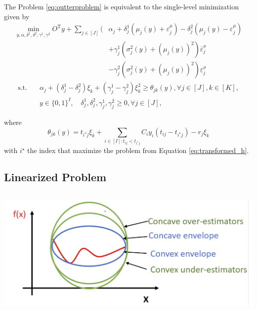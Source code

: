 \documentclass{beamer}
\newcommand{\T}{\mathrm{T}}
\begin{document}
\begin{frame}[allowframebreaks]
	\framebreak
	\begin{theorem}
		The Problem \ref{eq:outterproblem} is equivalent to the single-level minimization given by
		\begin{align*}
			\min_{y, \alpha, \delta^1, \delta^2, \gamma^1, \gamma^2} O^\T y + \sum_{j \in [J]} \Bigg( &\alpha_j + \delta_j^1 \left(\mu_j(y) + \varepsilon_j^\mu\right) - \delta_j^2 \left(\mu_j(y) - \varepsilon_j^\mu\right) \\
			& + \gamma_j^1 \left(\sigma_j^2(y) + (\mu_j(y))^2\right)\overline{\varepsilon}_j^\sigma \\
			& - \gamma_j^2 \left(\sigma_j^2(y) + (\mu_j(y))^2\right)\underline{\varepsilon}_j^\sigma
		\end{align*}
		\begin{align*}
			\text{s.t.}\quad &\alpha_j + (\delta_j^1 - \delta_j^2)\xi_k + (\gamma_j^1 - \gamma_j^2)\xi_k^2 \ge \theta_{jk}(y), \forall j \in [J], k \in [K], \\
			& y \in \{0, 1\}^I, \quad \delta_j^1, \delta_j^2, \gamma_j^1, \gamma_j^2 \ge 0, \forall j \in [J],
		\end{align*}
	\end{theorem}
	
	\framebreak
	\begin{theorem}
		where
		\begin{equation*}
			\theta_{jk}(y) = t_{i^\star j} \xi_k + \sum_{i \in [I]: t_{ij} < t_{i^\star j}} C_i y_i (t_{ij} - t_{i^\star j}) - r_j \xi_k
		\end{equation*}
		with $i^\star$ the index that maximize the problem from Equation \ref{eq:transformed_h}.
	\end{theorem}
\end{frame}

\subsection{Linearized Problem}
\begin{frame}
	\begin{columns}
		
		\includegraphics[width=\textwidth]{../figure/mccormick.png}
	\end{columns}
\end{frame}
\end{document}
